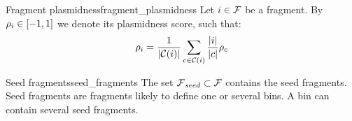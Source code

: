 \begin{definition}{Fragment plasmidness}{fragment_plasmidness}
  Let \(i \in \mathcal{F}{}\) be a fragment.
  By \(\rho_{i} \in [-1, 1]\) we denote its plasmidness score, such that:
  \[
    \rho_{i} = \frac{ 1 }{ |\mathcal{C}{}(i)| } \sum_{c \in \mathcal{C}{}(i)} \frac{ |i| }{ |c| }\rho_{c}
  \]
\end{definition}

\begin{definition}{Seed fragments}{seed_fragments}
  The set \(\mathcal{F}{}_{seed}{} \subset \mathcal{F}{}\) contains the seed fragments.
  Seed fragments are fragments likely to define one or several bins.
  A bin can contain several seed fragments.
\end{definition}